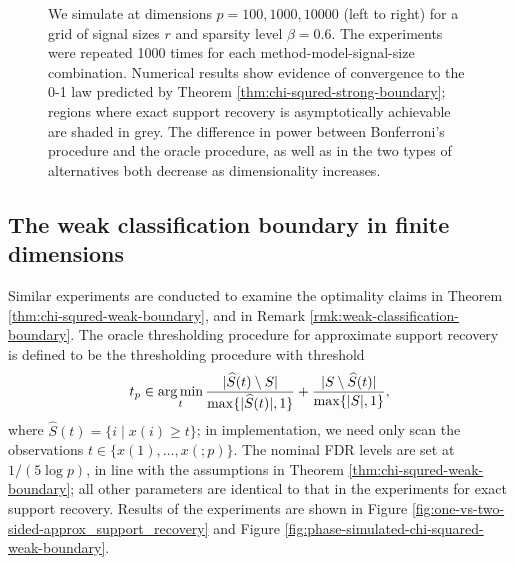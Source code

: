 \begin{figure}
{      We simulate at dimensions $p=100, 1000, 10000$ (left to right) for a grid of signal sizes $r$ and sparsity level $\beta=0.6$.
      The experiments were repeated 1000 times for each method-model-signal-size combination. 
      Numerical results show evidence of convergence to the 0-1 law predicted by Theorem \ref{thm:chi-squred-strong-boundary}; regions where exact support recovery is asymptotically achievable are shaded in grey.
      The difference in power between Bonferroni's procedure and the oracle procedure, as well as in the two types of alternatives both decrease as dimensionality increases.} 
      \label{fig:one-vs-two-sided-exact_support_recovery}
\end{figure}

\subsection{The weak classification boundary in finite dimensions}

Similar experiments are conducted to examine the optimality claims in Theorem \ref{thm:chi-squred-weak-boundary}, and in Remark \ref{rmk:weak-classification-boundary}.
The oracle thresholding procedure for approximate support recovery is defined to be the thresholding procedure with threshold
$$
t_p \in \operatorname*{arg\,min}_{t} \frac{|\widehat{S}(t)\setminus S|}{\max\{|\widehat{S}(t)|,1\}} + \frac{|S\setminus \widehat{S}(t)|}{\max\{|{S}|,1\}},
$$
where $\widehat{S}(t) = \{i\;|\;x(i)\ge t\}$;
in implementation, we need only scan the observations $t\in\{x(1), \ldots, x(;p)\}$. 
The nominal FDR levels are set at $1/(5{\log{p}})$, in line with the assumptions in Theorem \ref{thm:chi-squred-weak-boundary}; all other parameters are identical to that in the experiments for exact support recovery.
Results of the experiments are shown in Figure \ref{fig:one-vs-two-sided-approx_support_recovery} and Figure \ref{fig:phase-simulated-chi-squared-weak-boundary}.


